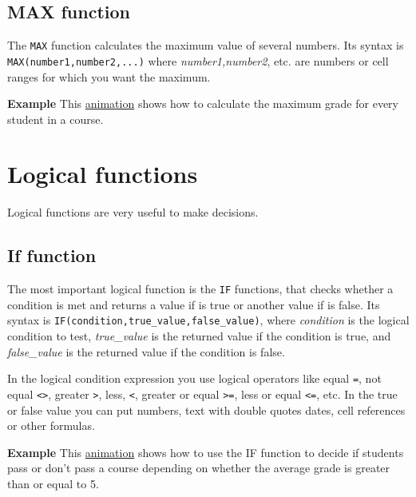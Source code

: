 \subsection{MAX function}\hypertarget{max-function}{}\label{max-function}

The \texttt{MAX} function calculates the maximum value of several numbers. Its syntax is \texttt{MAX(number1,number2,...)} where \emph{number1,number2}, etc. are numbers or cell ranges for which you want the maximum.

\textbf{Example} This \href{http://aprendeconalf.es/office/excel/manual/img/example_function_max.gif}{animation} shows how to calculate the maximum grade for every student in a course.

\section{Logical functions}\hypertarget{logical-functions}{}\label{logical-functions}

Logical functions are very useful to make decisions.

\subsection{If function}\hypertarget{if-function}{}\label{if-function}

The most important logical function is the \texttt{IF} functions, that checks whether a condition is met and returns a value if is true or another value if is false. Its syntax is \texttt{IF(condition,true\_value,false\_value)}, where \emph{condition} is the logical condition to test, \emph{true\_value} is the returned value if the condition is true, and \emph{false\_value} is the returned value if the condition is false.

In the logical condition expression you use logical operators like equal \texttt{=}, not equal \texttt{\textless{}\textgreater{}}, greater \texttt{\textgreater{}}, less, \texttt{\textless{}}, greater or equal \texttt{\textgreater{}=}, less or equal \texttt{\textless{}=}, etc. In the true or false value you can put numbers, text with double quotes dates, cell references or other formulas.

\textbf{Example} This \href{http://aprendeconalf.es/office/excel/manual/img/example_function_if.gif}{animation} shows how to use the IF function to decide if students pass or don't pass a course depending on whether the average grade is greater than or equal to 5.

